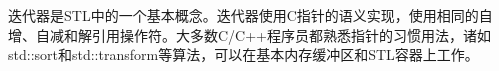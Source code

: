 迭代器是STL中的一个基本概念。迭代器使用C指针的语义实现，使用相同的自增、自减和解引用操作符。大多数C/C++程序员都熟悉指针的习惯用法，诸如std::sort和std::transform等算法，可以在基本内存缓冲区和STL容器上工作。